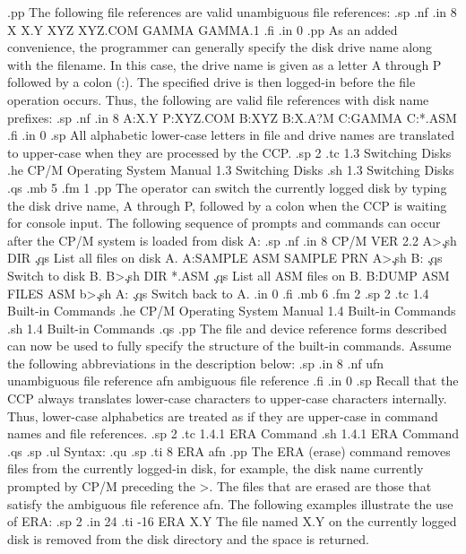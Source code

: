 .pp
The following file references are valid unambiguous file references:
.sp
.nf
.in 8
X            
X.Y          
XYZ    
XYZ.COM
GAMMA  
GAMMA.1
.fi
.in 0
.pp
As an added convenience, the programmer can generally specify the disk drive 
name along with the filename.  In this case, the drive name is given as a 
letter A through P followed by a colon (:).  The specified drive is 
then logged-in before the file operation occurs.  Thus, the following are 
valid file references with disk name prefixes:
.sp
.nf
.in 8
A:X.Y           
P:XYZ.COM       
B:XYZ  
B:X.A?M
C:GAMMA
C:*.ASM
.fi
.in 0
.sp
All alphabetic lower-case letters in file and drive names are translated to 
upper-case when they are processed by the CCP.
.sp 2
.tc    1.3  Switching Disks
.he CP/M Operating System Manual                 1.3  Switching Disks
.sh
1.3  Switching Disks
.qs
.mb 5
.fm 1
.pp
The operator can switch the currently logged disk by typing the disk drive 
name, A through P, followed by a colon when the CCP is waiting for 
console input.  The following sequence of prompts and commands 
can occur after the CP/M system is loaded from disk A:
.sp
.nf
.in 8
CP/M VER 2.2
A>\c
.sh
DIR                     \c
.qs
List all files on disk A.     
A:SAMPLE ASM SAMPLE PRN
A>\c
.sh
B:                      \c
.qs
Switch to disk B. 
B>\c
.sh
DIR *.ASM               \c
.qs
List all ASM files on B.
B:DUMP ASM FILES ASM
b>\c
.sh
A:                      \c
.qs
Switch back to A.
.in 0
.fi
.mb 6
.fm 2
.sp 2
.tc    1.4  Built-in Commands
.he CP/M Operating System Manual               1.4  Built-in Commands
.sh
1.4  Built-in Commands
.qs
.pp
The file and device reference forms described can now be used to fully 
specify the structure of the built-in commands.  Assume the following 
abbreviations in the description below:
.sp
.in 8
.nf
ufn   unambiguous file reference
afn   ambiguous file reference
.fi
.in 0
.sp
Recall that the CCP always translates lower-case characters to upper-case 
characters internally.  Thus, lower-case alphabetics are treated as if they 
are upper-case in command names and file references.
.sp 2
.tc         1.4.1  ERA Command
.sh
1.4.1  ERA Command
.qs
.sp
.ul
Syntax:
.qu
.sp
.ti 8
ERA afn
.pp
The ERA (erase) command removes files from the currently logged-in 
disk, for example, the disk name currently prompted by CP/M preceding the >.  
The files that are erased are those that satisfy the ambiguous file 
reference afn.  The following examples illustrate the use of ERA:
.sp 2
.in 24
.ti -16
ERA X.Y         The file named X.Y on the currently logged disk is removed 
from the disk directory and the space is returned.
